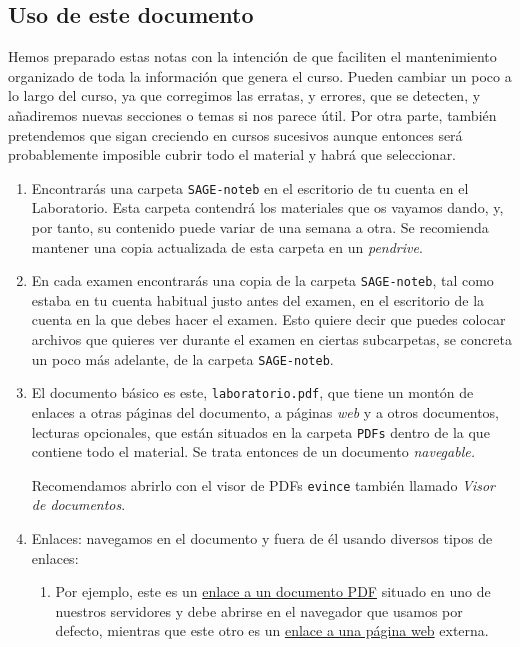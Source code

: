 \begin{appendices}
\chapter{Uso de este documento}

Hemos preparado estas notas  con la intenci\'on de que faciliten el
mantenimiento organizado de toda la informaci\'on que genera el curso.
Pueden cambiar un poco a lo largo del curso, ya que corregimos las erratas, y errores, que se detecten, y a\~nadiremos nuevas secciones o temas  si nos parece \'util.
Por otra parte, tambi\'en pretendemos que sigan creciendo en cursos sucesivos
aunque entonces ser\'a probablemente imposible cubrir todo el material y habr\'a
que seleccionar. 

\begin{enumerate}

\item Encontrar\'as una carpeta \verb|SAGE-noteb| en el escritorio de tu cuenta
en el Laboratorio. Esta carpeta contendr\'a  los materiales que os vayamos
dando, y, por tanto, su contenido puede variar de una semana a
otra. Se recomienda mantener  una copia actualizada de esta carpeta en un {\itshape pendrive}. 

\item En cada examen encontrar\'as una copia de la carpeta \verb|SAGE-noteb|,
tal como estaba en tu cuenta habitual justo antes del examen, en el escritorio
de la cuenta en la que debes hacer el examen. Esto quiere decir que puedes
colocar archivos que quieres ver durante el examen en ciertas subcarpetas, se
concreta un poco m\'as adelante,  de la carpeta \verb|SAGE-noteb|.


\item El documento b\'asico es este, \verb|laboratorio.pdf|, que tiene un
mont\'on de
enlaces a otras p\'aginas del documento,  a p\'aginas {\itshape web} y a otros
documentos, lecturas opcionales, que est\'an situados en la carpeta \verb|PDFs|
dentro de la que contiene todo el material. Se trata entonces de un documento
\emph{navegable.}

{\sc Recomendamos} abrirlo con el visor de PDFs {\tt evince} tambi\'en llamado
{\itshape Visor de documentos}.


\item {\sc Enlaces:} navegamos en el documento y fuera de \'el usando diversos tipos de enlaces:
\begin{enumerate}
\item Por ejemplo, este es un \href{http://150.244.21.37/PDFs/INTRO/ltxprimer-1.0.pdf}{enlace a
un documento PDF} situado 
en uno de nuestros servidores y  debe abrirse en el navegador que usamos por defecto, mientras que este otro es un 
\href{http://www.sagemath.org/}{enlace a una p\'agina web} externa.




\end{enumerate}
\end{enumerate}
\end{appendices}
